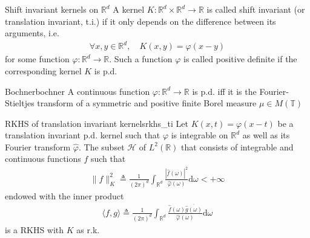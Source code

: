 \documentclass[10pt]{article}
\begin{document}
\begin{Definition}{Shift invariant kernels on $\mathbb{R}^d$}{}
  A kernel $K: \mathbb{R}^d\times \mathbb{R}^d \rightarrow\mathbb{R}$ is called 
  shift invariant (or translation invariant, t.i.) if it only depends on the 
  difference between its arguments, i.e. 
  \begin{align*}
    \forall x, y \in \mathbb{R}^d, \quad K(x, y) = \varphi(x-y)
  \end{align*}
  for some function $\varphi : \mathbb{R}^d\rightarrow \mathbb{R}$. Such a 
  function $\varphi$ is called positive definite if the corresponding kernel 
  $K$ is p.d.
\end{Definition}

\begin{Theorem}{Bochner}{bochner}
  A continuous function $\varphi : \mathbb{R}^d\rightarrow \mathbb{R}$ is p.d. 
  iff it is the Fourier-Stieltjes transform of a symmetric and positive finite
  Borel measure $\mu \in M(\mathbb{T})$
\end{Theorem}

\begin{Theorem}{RKHS of translation invariant kernels}{rkhs_ti}
  Let $K(x,t) = \varphi(x-t)$ be a translation invariant p.d. kernel  such that
  $\varphi$ is integrable on $\mathbb{R}^d$ as well as its Fourier transform 
  $\hat{\varphi}$. The subset $\mathcal{H}$ of $L^2(\mathbb{R})$ that consists
  of integrable and continuous functions $f$ such that 
  \begin{align*}
    \lVert f \rVert^2_K \triangleq \frac{1}{(2\pi)^d}\int_{\mathbb{R}^d}
    \frac{\left|\hat{f}(\omega)\right|^2}{\hat{\varphi}(\omega)}\text{d}\omega
    < +\infty
  \end{align*}
  endowed with the inner product
  \begin{align*}
    \langle f, g \rangle \triangleq \frac{1}{(2\pi)^d}\int_{\mathbb{R}^d}
    \frac{\hat{f}(\omega)\overline{\hat{g}(\omega)}}{\hat{\varphi}(\omega)}
    \text{d}\omega
  \end{align*}
  is a RKHS with $K$ as r.k.
\end{Theorem}
\end{document}
